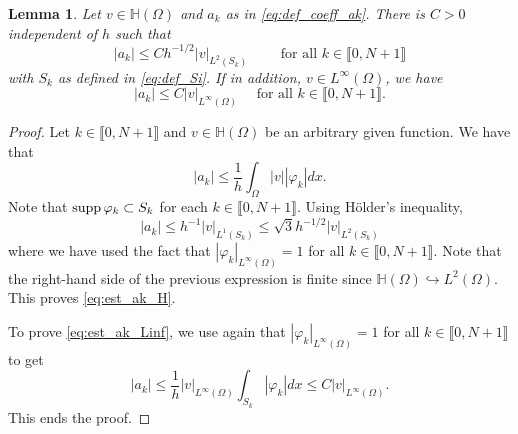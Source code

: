 \documentclass[10 pt]{article}
\newcommand\inter[1]{\llbracket #1\rrbracket}
\newtheorem{lemma}[theorem]{Lemma}
\numberwithin{equation}{section}
\begin{document}
%
\begin{lemma}\label{lem:bounds_aks}
Let $v\in \mathbb H(\Omega)$ and $a_k$ as in \eqref{eq:def_coeff_ak}. There is $C>0$ independent of $h$ such that
%
\begin{equation}\label{eq:est_ak_H}
    |a_k|\leq C h^{-1/2} |v|_{L^2(S_k)}\qquad \text{ for all } k\in\inter{0,N+1}
\end{equation}
%
with $S_k$ as defined in \eqref{eq:def_Si}. If in addition, $v\in L^\infty(\Omega)$, we have
\begin{equation}\label{eq:est_ak_Linf}
    |a_k|\leq C |v|_{L^\infty(\Omega)} \quad\text{ for all } k\in\inter{0,N+1}.
\end{equation}
\end{lemma}
%
\begin{proof}
Let $k\in\inter{0,N+1}$ and $v\in\mathbb H(\Omega)$ be an arbitrary given function. We have that
%
\begin{equation}
    |a_k|\leq \frac{1}{h}\int_{\Omega}|v||\varphi_k|dx.
\end{equation}
%
Note that $\textnormal{supp}\,\varphi_k\subset S_k$ for each $k\in\inter{0,N+1}$. Using H\"older's inequality,
%
\begin{equation}
    |a_k|\leq h^{-1}|v|_{L^1(S_k)}\leq \sqrt{3}h^{-1/2}|v|_{L^2(S_k)}
\end{equation}
%
where we have used the fact that $|\varphi_k|_{L^\infty(\Omega)}=1$ for all $k\in\inter{0,N+1}$. Note that the right-hand side of the previous expression is finite since $\mathbb H(\Omega)\hookrightarrow L^2(\Omega)$. This proves \eqref{eq:est_ak_H}. 

To prove \eqref{eq:est_ak_Linf}, we use again that $|\varphi_k|_{L^\infty(\Omega)}=1$ for all $k\in\inter{0,N+1}$ to get
%
\begin{equation}
    |a_k|\leq \frac{1}{h}|v|_{L^\infty(\Omega)}\int_{S_k}|\varphi_k| dx \leq C|v|_{L^\infty(\Omega)}.
\end{equation}
%
This ends the proof.
\end{proof}
\end{document}
